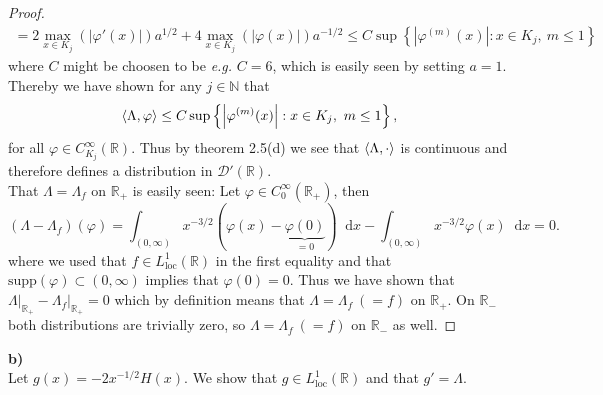 \documentclass[a4paper,11pt]{article}
\newcommand{\supp}{\text{supp}}
\newcommand{\abs}[1]{\left\lvert #1 \right\rvert}
\newcommand*\diff{\mathop{}\!\mathrm{d}}
\newcommand{\eg}{\emph{e.g.} }
\newcommand{\R}{\mathbb{R}}
\newcommand{\N}{\mathbb{N}}
\newcommand{\loc}{\text{loc}}
\numberwithin{equation}{section}
\begin{document}
\begin{proof}
\begin{equation}
\begin{aligned}
	=2\max_{x\in K_j }(\abs{\varphi'(x)}) a^{1/2}+4\max_{x\in K_j}(\abs{\varphi(x)})a^{-1/2}\leq C \sup\left\{\abs{\varphi^{(m)}(x)} : x\in K_j,\ m\leq 1\right\}
	\end{aligned}
	\end{equation}
	where $ C $ might be choosen to be \eg $ C=6 $, which is easily seen by setting $ a=1 $. 
	Thereby we have shown for any $ j\in \N $ that \begin{equation}
	\braket{\Lambda,\varphi}\leq C \sup\left\{\abs{\varphi^{(m)}(x)} : x\in K_j,\ m\leq 1\right\},
	\end{equation} for all $ \varphi\in C^\infty_{K_j}(\R) $. Thus by theorem 2.5(d) we see that $ \braket{\Lambda,\cdot} $ is continuous and therefore defines a distribution in $ \mathcal{D}'(\R) $.\\
	That $ \Lambda=\Lambda_f $ on $ \R_+ $ is easily seen: Let $ \varphi\in C^\infty_0(\R_+) $, then \begin{equation}
	(\Lambda-\Lambda_f)(\varphi)=\int_{(0,\infty)} x^{-3/2} \left(\varphi(x)-\underbrace{\varphi(0)}_{=0}\right)\diff x-\int_{(0,\infty)} x^{-3/2}\varphi(x)\diff x=0.
	\end{equation}
	where we used that $ f\in L^1_\loc(\R) $ in the first equality and that $ \supp(\varphi)\subset(0,\infty) $ implies that $ \varphi(0)=0 $. Thus we have shown that $ \Lambda\lvert_{\R_+}-\Lambda_f\lvert_{\R_+}=0 $ which by definition means that $ \Lambda=\Lambda_f\ (=f) $ on $ \R_+ $. On $ \R_- $ both distributions are trivially zero, so $ \Lambda=\Lambda_f\ (=f) $ on $ \R_- $ as well. 
\end{proof}
\vspace{0.2cm}
\noindent\textbf{b)}\\
Let $ g(x)=-2x^{-1/2}H(x) $. We show that $ g\in L^1_\loc(\R) $ and that $ g'=\Lambda $.
\end{document}
